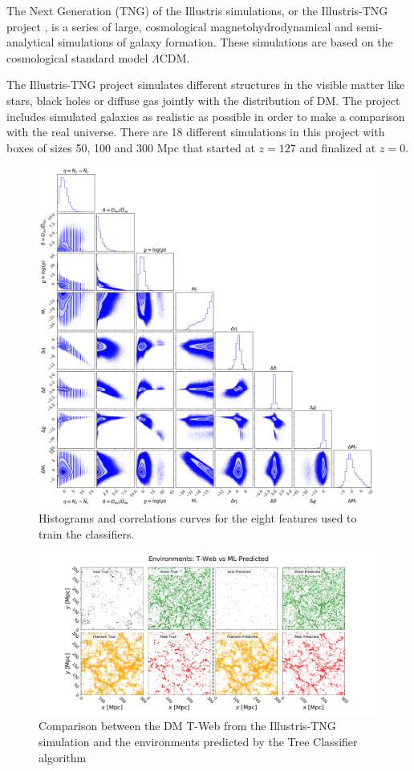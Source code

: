 \documentclass[usenatbib]{mnras}
\begin{document}
The Next Generation (TNG) of the Illustris simulations, or the Illustris-TNG project \citep{Nelson2015}, 
is a series of large, cosmological magnetohydrodynamical and semi-analytical simulations of
galaxy formation. These simulations are based on the cosmological standard model $\Lambda$CDM.

The Illustris-TNG project simulates different structures in the visible matter like stars, black
holes or diffuse gas jointly with the distribution of DM. 
The project includes simulated galaxies as realistic as possible in order to make a comparison
with the real universe.
There are 18 different simulations in this project with boxes of sizes 50, 100 and 300 Mpc
that started at  $z=127$ and finalized at $z=0$. 

\begin{figure}
        \includegraphics[scale=0.4]{Figs/p_all_features_correlations.pdf}
    \caption{Histograms and correlations curves for the eight features used to train the classifiers.}
    \label{fig:features}
\end{figure}

\begin{figure}
  \centering 
    \includegraphics[scale=0.33]{Figs/Fig2.pdf}
    \caption{Comparison between the DM T-Web from the Illustris-TNG simulation and the environments predicted by the Tree Classifier algorithm}
    \label{fig:prediction}
\end{figure}
\end{document}
